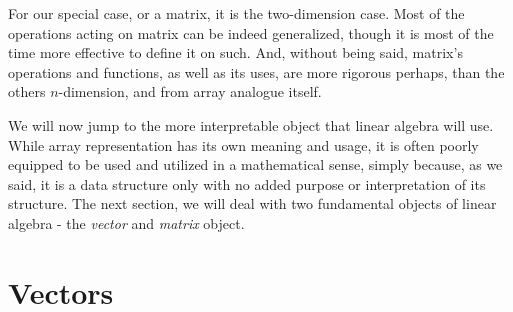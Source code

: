 \begin{center}
\end{center}
For our special case, or a matrix, it is the two-dimension case. Most of the operations acting on matrix can be indeed generalized, though it is most of the time more effective to define it on such. And, without being said, matrix's operations and functions, as well as its uses, are more rigorous perhaps, than the others $n$-dimension, and from array analogue itself. 

We will now jump to the more interpretable object that linear algebra will use. While array representation has its own meaning and usage, it is often poorly equipped to be used and utilized in a mathematical sense, simply because, as we said, it is a data structure only with no added purpose or interpretation of its structure. The next section, we will deal with two fundamental objects of linear algebra - the \textit{vector} and \textit{matrix} object.

\section{Vectors}

